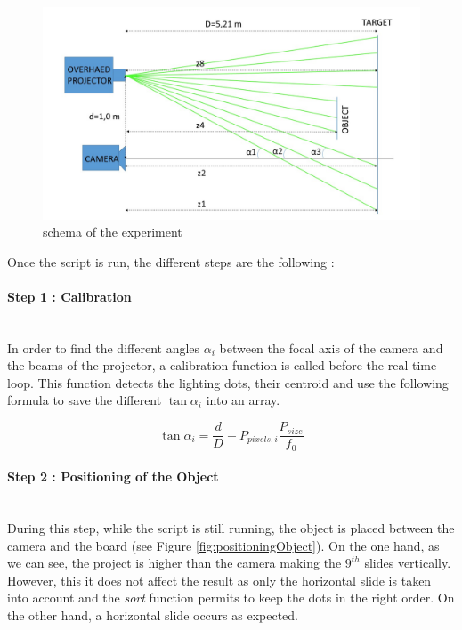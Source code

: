 \begin{figure}[H]
  \centerline{\includegraphics[scale=0.4]{fig/expGridSchema.jpg}}
  \caption{schema of the experiment}
  \label{fig:expGridSchema}
\end{figure}


Once the script is run, the different steps are the following :
\paragraph*{Step 1 : Calibration}
~~\\
In order to find the different angles $\alpha_i$ between the focal axis of the camera and the beams of the projector, a calibration function is called before the real time loop. This function detects the lighting dots, their centroid and use the following formula to save the different $\tan \alpha_i$ into an array.

\begin{equation*}
\tan \alpha_i = \frac{d}{D}-P_{pixels,i}\frac{P_{size}}{f_0}
\end{equation*}


\paragraph*{Step 2 : Positioning of the Object}
~~\\
During this step, while the script is still running, the object is placed between the camera and the board (see Figure \ref{fig:positioningObject}). On the one hand, as we can see, the project is higher than the camera making the $9^{th}$ slides vertically. However, this it does not affect the result as only the horizontal slide is taken into account and the \emph{sort} function permits to keep the dots in the right order. On the other hand, a horizontal slide occurs as expected.

